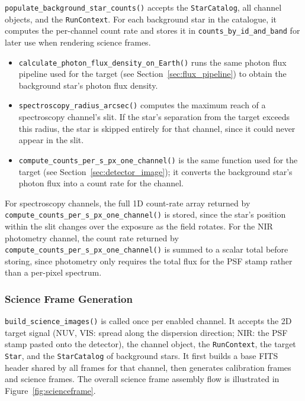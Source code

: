\texttt{populate\_background\_star\_counts()} accepts the \texttt{StarCatalog}, all channel objects, and the \texttt{RunContext}. For each background star in the catalogue, it computes the per-channel count rate and stores it in \texttt{counts\_by\_id\allowbreak\_and\_band} for later use when rendering science frames.

\begin{itemize}
    \item \texttt{calculate\_photon\_flux\_density\_on\_Earth()} runs the same photon flux pipeline used for the target (see Section~\ref{sec:flux_pipeline}) to obtain the background star's photon flux density.

    \item \texttt{spectroscopy\_radius\_arcsec()} computes the maximum reach of a spectroscopy channel's slit. If the star's separation from the target exceeds this radius, the star is skipped entirely for that channel, since it could never appear in the slit.

    \item \texttt{compute\_counts\_per\_s\_px\_one\_channel()} is the same function used for the target (see Section~\ref{sec:detector_image}); it converts the background star's photon flux into a count rate for the channel.
\end{itemize}

For spectroscopy channels, the full 1D count-rate array returned by \texttt{compute\_counts\_per\_s\_px\_one\_channel()} is stored, since the star's position within the slit changes over the exposure as the field rotates. For the NIR photometry channel, the count rate returned by \texttt{compute\_counts\_per\_s\_px\_one\_channel()} is summed to a scalar total before storing, since photometry only requires the total flux for the PSF stamp rather than a per-pixel spectrum.

\subsubsection{Science Frame Generation}
\label{sec:science_image}

\texttt{build\_science\_images()} is called once per enabled channel. It accepts the 2D target signal (NUV, VIS: spread along the dispersion direction; NIR: the PSF stamp pasted onto the detector), the channel object, the \texttt{RunContext}, the target \texttt{Star}, and the \texttt{StarCatalog} of background stars. It first builds a base FITS header shared by all frames for that channel, then generates calibration frames and science frames. The overall science frame assembly flow is illustrated in Figure~\ref{fig:scienceframe}.



